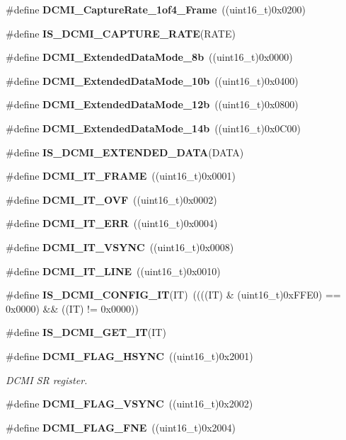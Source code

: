 \begin{DoxyCompactItemize}
\item 
\#define \textbf{ D\+C\+M\+I\+\_\+\+Capture\+Rate\+\_\+1of4\+\_\+\+Frame}~((uint16\+\_\+t)0x0200)
\item 
\#define \textbf{ I\+S\+\_\+\+D\+C\+M\+I\+\_\+\+C\+A\+P\+T\+U\+R\+E\+\_\+\+R\+A\+TE}(R\+A\+TE)
\item 
\#define \textbf{ D\+C\+M\+I\+\_\+\+Extended\+Data\+Mode\+\_\+8b}~((uint16\+\_\+t)0x0000)
\item 
\#define \textbf{ D\+C\+M\+I\+\_\+\+Extended\+Data\+Mode\+\_\+10b}~((uint16\+\_\+t)0x0400)
\item 
\#define \textbf{ D\+C\+M\+I\+\_\+\+Extended\+Data\+Mode\+\_\+12b}~((uint16\+\_\+t)0x0800)
\item 
\#define \textbf{ D\+C\+M\+I\+\_\+\+Extended\+Data\+Mode\+\_\+14b}~((uint16\+\_\+t)0x0\+C00)
\item 
\#define \textbf{ I\+S\+\_\+\+D\+C\+M\+I\+\_\+\+E\+X\+T\+E\+N\+D\+E\+D\+\_\+\+D\+A\+TA}(D\+A\+TA)
\item 
\#define \textbf{ D\+C\+M\+I\+\_\+\+I\+T\+\_\+\+F\+R\+A\+ME}~((uint16\+\_\+t)0x0001)
\item 
\#define \textbf{ D\+C\+M\+I\+\_\+\+I\+T\+\_\+\+O\+VF}~((uint16\+\_\+t)0x0002)
\item 
\#define \textbf{ D\+C\+M\+I\+\_\+\+I\+T\+\_\+\+E\+RR}~((uint16\+\_\+t)0x0004)
\item 
\#define \textbf{ D\+C\+M\+I\+\_\+\+I\+T\+\_\+\+V\+S\+Y\+NC}~((uint16\+\_\+t)0x0008)
\item 
\#define \textbf{ D\+C\+M\+I\+\_\+\+I\+T\+\_\+\+L\+I\+NE}~((uint16\+\_\+t)0x0010)
\item 
\#define \textbf{ I\+S\+\_\+\+D\+C\+M\+I\+\_\+\+C\+O\+N\+F\+I\+G\+\_\+\+IT}(IT)~((((IT) \& (uint16\+\_\+t)0x\+F\+F\+E0) == 0x0000) \&\& ((\+I\+T) != 0x0000))
\item 
\#define \textbf{ I\+S\+\_\+\+D\+C\+M\+I\+\_\+\+G\+E\+T\+\_\+\+IT}(IT)
\item 
\#define \textbf{ D\+C\+M\+I\+\_\+\+F\+L\+A\+G\+\_\+\+H\+S\+Y\+NC}~((uint16\+\_\+t)0x2001)
\begin{DoxyCompactList}\small\item\em D\+C\+MI SR register. \end{DoxyCompactList}\item 
\#define \textbf{ D\+C\+M\+I\+\_\+\+F\+L\+A\+G\+\_\+\+V\+S\+Y\+NC}~((uint16\+\_\+t)0x2002)
\item 
\#define \textbf{ D\+C\+M\+I\+\_\+\+F\+L\+A\+G\+\_\+\+F\+NE}~((uint16\+\_\+t)0x2004)
\item 

\end{DoxyCompactItemize}
